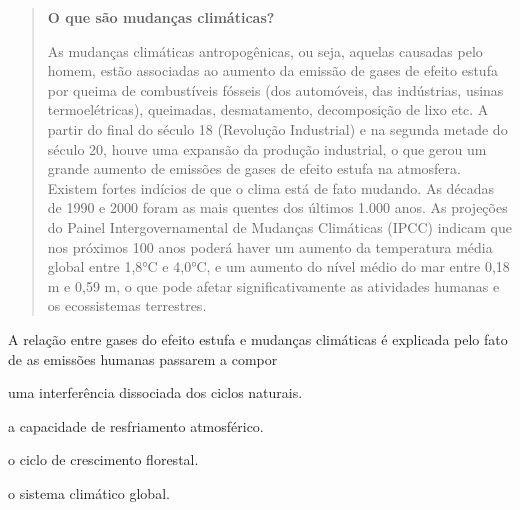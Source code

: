 \begin{quote}
\textbf{O que são mudanças climáticas?}

As mudanças climáticas antropogênicas, ou seja, aquelas causadas
pelo homem, estão associadas ao aumento da emissão de gases de efeito
estufa por queima de combustíveis fósseis (dos automóveis, das
indústrias, usinas termoelétricas), queimadas, desmatamento,
decomposição de lixo etc. A partir do final do século 18 (Revolução
Industrial) e na segunda metade do século 20, houve uma expansão da
produção industrial, o que gerou um grande aumento de emissões de gases
de efeito estufa na atmosfera. Existem fortes indícios de que o clima
está de fato mudando. As décadas de 1990 e 2000 foram as mais quentes
dos últimos 1.000 anos. As projeções do Painel Intergovernamental de
Mudanças Climáticas (IPCC) indicam que nos próximos 100 anos poderá
haver um aumento da temperatura média global entre 1,8°C e 4,0°C, e um
aumento do nível médio do mar entre 0,18 m e 0,59 m, o que pode afetar
significativamente as atividades humanas e os ecossistemas terrestres.

\end{quote}

A relação entre gases do efeito estufa e mudanças climáticas é explicada pelo fato
de as emissões humanas passarem a compor

\begin{escolha}
\item
  uma interferência dissociada dos ciclos naturais.
\item
  a capacidade de resfriamento atmosférico.
\item
  o ciclo de crescimento florestal.
\item
  o sistema climático global.
\end{escolha}


